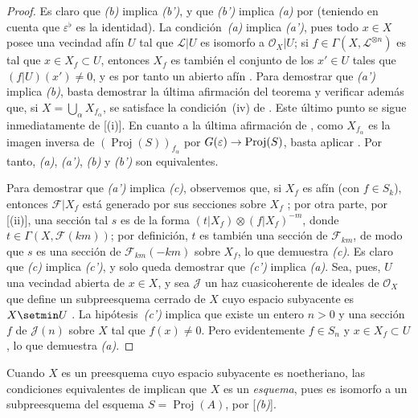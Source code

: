 \documentclass[oneside,10pt]{amsart}
\makeatletter
\newcommand{\ega@arrow}[2]{\mathchoice{#1}{#2}{#2}{#2}}
\renewcommand{\to}{\ega@arrow{\longrightarrow}{\rightarrow}}
\makeatother
\begin{document}
\begin{proof}
Es claro que \emph{(b)} implica \emph{(b')}, y que \emph{(b')} implica \emph{(a)} por  (teniendo en cuenta que $\varepsilon^\flat$ es la identidad).
La condición~\emph{(a)} implica \emph{(a')}, pues todo $x\in X$ posee una vecindad afín $U$ tal que $\mathcal{L}|U$ es isomorfo a $\mathcal{O}_X|U$;
si $f\in\Gamma(X,\mathcal{L}^{\otimes n})$ es tal que $x\in X_f\subset U$, entonces $X_f$ es también el conjunto de los $x'\in U$ tales que $(f|U)(x')\neq0$, y es por tanto un abierto afín .
Para demostrar que \emph{(a')} implica \emph{(b)}, basta demostrar la última afirmación del teorema y verificar además que, si $X=\bigcup_\alpha X_{f_\alpha}$, se satisface la condición~(iv) de .
Este último punto se sigue inmediatamente de [(i)].
En cuanto a la última afirmación de , como $X_{f_\alpha}$ es la imagen inversa de $(\operatorname{Proj}(S))_{f_\alpha}$ por $G(\varepsilon)\to\operatorname{Proj}(S)$, basta aplicar .
Por tanto, \emph{(a)}, \emph{(a')}, \emph{(b)} y \emph{(b')} son equivalentes.

Para demostrar que \emph{(a')} implica \emph{(c)}, observemos que, si $X_f$ es afín (con $f\in S_k$), entonces $\mathcal{F}|X_f$ está generado por sus secciones sobre $X_f$ ;
por otra parte, por [(ii)], una sección tal $s$ es de la forma $(t|X_f)\otimes(f|X_f)^{-m}$, donde $t\in\Gamma(X,\mathcal{F}(km))$;
por definición, $t$ es también una sección de $\mathcal{F}_{km}$, de modo que $s$ es una sección de $\mathcal{F}_{km}(-km)$ sobre $X_f$, lo que demuestra \emph{(c)}.
Es claro que \emph{(c)} implica \emph{(c')}, y solo queda demostrar que \emph{(c')} implica \emph{(a)}.
Sea, pues, $U$ una vecindad abierta de $x\in X$, y sea $\mathcal{J}$ un haz cuasicoherente de ideales de $\mathcal{O}_X$ que define un subpreesquema cerrado de $X$ cuyo espacio subyacente es $X\setmin U$ .
La hipótesis~\emph{(c')} implica que existe un entero $n>0$ y una sección $f$ de $\mathcal{J}(n)$ sobre $X$ tal que $f(x)\neq0$.
Pero evidentemente $f\in S_n$ y $x\in X_f\subset U$, lo que demuestra \emph{(a)}.
\end{proof}

Cuando $X$ es un preesquema cuyo espacio subyacente es noetheriano, las condiciones equivalentes de  implican que $X$ es un \emph{esquema}, pues es isomorfo a un subpreesquema del esquema $S=\operatorname{Proj}(A)$, por [\emph{(b)}].
\end{document}
